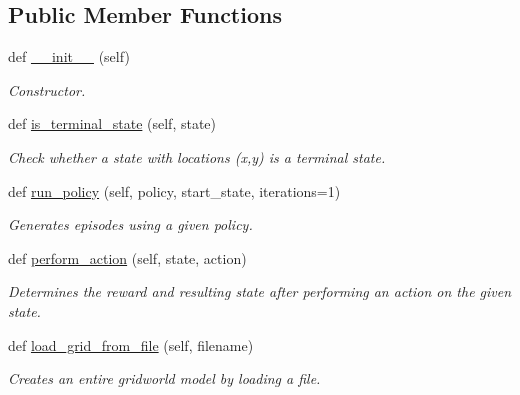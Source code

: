 \subsection*{Public Member Functions}
\begin{DoxyCompactItemize}
\item 
\mbox{\label{classsrc_1_1worlds_1_1grid__world_1_1_grid_world_afe3c1b392afbc00fb9a76c14a6e07899}} 
def \hyperlink{classsrc_1_1worlds_1_1grid__world_1_1_grid_world_afe3c1b392afbc00fb9a76c14a6e07899}{\+\_\+\+\_\+init\+\_\+\+\_\+} (self)
\begin{DoxyCompactList}\small\item\em Constructor. \end{DoxyCompactList}\item 
def \hyperlink{classsrc_1_1worlds_1_1grid__world_1_1_grid_world_a99e2c85924fd138eb2ee698e29ad1d09}{is\+\_\+terminal\+\_\+state} (self, state)
\begin{DoxyCompactList}\small\item\em Check whether a state with locations (x,y) is a terminal state. \end{DoxyCompactList}\item 
def \hyperlink{classsrc_1_1worlds_1_1grid__world_1_1_grid_world_acfc919972f8a9c974baa36134ee980a0}{run\+\_\+policy} (self, policy, start\+\_\+state, iterations=1)
\begin{DoxyCompactList}\small\item\em Generates episodes using a given policy. \end{DoxyCompactList}\item 
def \hyperlink{classsrc_1_1worlds_1_1grid__world_1_1_grid_world_a93de8a88475e8ad0530fe703343028c9}{perform\+\_\+action} (self, state, action)
\begin{DoxyCompactList}\small\item\em Determines the reward and resulting state after performing an action on the given state. \end{DoxyCompactList}\item 
def \hyperlink{classsrc_1_1worlds_1_1grid__world_1_1_grid_world_a49dba2f7cbb6c4f5ccb05b6c1f7a0000}{load\+\_\+grid\+\_\+from\+\_\+file} (self, filename)
\begin{DoxyCompactList}\small\item\em Creates an entire gridworld model by loading a file. \end{DoxyCompactList}\end{DoxyCompactItemize}
